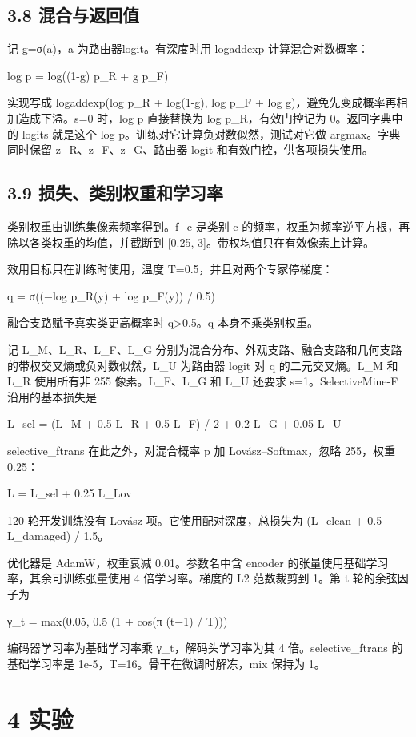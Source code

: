 \documentclass[UTF8,a4paper,11pt]{ctexart}
\begin{document}
\subsection*{3.8 混合与返回值}
记 g=σ(a)，a 为路由器logit。有深度时用 logaddexp 计算混合对数概率：

log p = log((1-g) p\_R + g p\_F)

实现写成 logaddexp(log p\_R + log(1-g), log p\_F + log g)，避免先变成概率再相加造成下溢。s=0 时，log p 直接替换为 log p\_R，有效门控记为 0。返回字典中的 logits 就是这个 log p。训练对它计算负对数似然，测试对它做 argmax。字典同时保留 z\_R、z\_F、z\_G、路由器 logit 和有效门控，供各项损失使用。

\subsection*{3.9 损失、类别权重和学习率}
类别权重由训练集像素频率得到。f\_c 是类别 c 的频率，权重为频率逆平方根，再除以各类权重的均值，并截断到 [0.25, 3]。带权均值只在有效像素上计算。

效用目标只在训练时使用，温度 T=0.5，并且对两个专家停梯度：

q = σ((−log p\_R(y) + log p\_F(y)) / 0.5)

融合支路赋予真实类更高概率时 q>0.5。q 本身不乘类别权重。

记 L\_M、L\_R、L\_F、L\_G 分别为混合分布、外观支路、融合支路和几何支路的带权交叉熵或负对数似然，L\_U 为路由器 logit 对 q 的二元交叉熵。L\_M 和 L\_R 使用所有非 255 像素。L\_F、L\_G 和 L\_U 还要求 s=1。SelectiveMine-F 沿用的基本损失是

L\_sel = (L\_M + 0.5 L\_R + 0.5 L\_F) / 2 + 0.2 L\_G + 0.05 L\_U

selective\_ftrans 在此之外，对混合概率 p 加 Lovász–Softmax，忽略 255，权重 0.25：

L = L\_sel + 0.25 L\_Lov

120 轮开发训练没有 Lovász 项。它使用配对深度，总损失为 (L\_clean + 0.5 L\_damaged) / 1.5。

优化器是 AdamW，权重衰减 0.01。参数名中含 encoder 的张量使用基础学习率，其余可训练张量使用 4 倍学习率。梯度的 L2 范数裁剪到 1。第 t 轮的余弦因子为

γ\_t = max(0.05, 0.5 (1 + cos(π (t−1) / T)))

编码器学习率为基础学习率乘 γ\_t，解码头学习率为其 4 倍。selective\_ftrans 的基础学习率是 1e-5，T=16。骨干在微调时解冻，mix 保持为 1。

\section*{4 实验}
\end{document}
